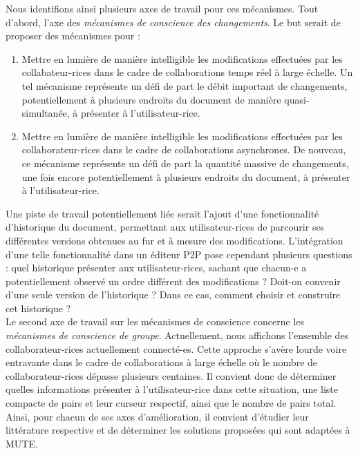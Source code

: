 Nous identifions ainsi plusieurs axes de travail pour ces mécanismes.
Tout d'abord, l'axe des \emph{mécanismes de conscience des changements}.
Le but serait de proposer des mécanismes pour :
\begin{enumerate}
    \item Mettre en lumière de manière intelligible les modifications effectuées par les collabateur-rices dans le cadre de collaborations temps réel à large échelle.
        Un tel mécanisme représente un défi de part le débit important de changements, potentiellement à plusieurs endroits du document de manière quasi-simultanée, à présenter à l'utilisateur-rice.
    \item Mettre en lumière de manière intelligible les modifications effectuées par les collaborateur-rices dans le cadre de collaborations asynchrones.
        De nouveau, ce mécanisme représente un défi de part la quantité massive de changements, une fois encore potentiellement à plusieurs endroits du document, à présenter à l'utilisateur-rice.
\end{enumerate}
Une piste de travail potentiellement liée serait l'ajout d'une fonctionnalité d'historique du document, permettant aux utilisateur-rices de parcourir ses différentes versions obtenues au fur et à mesure des modifications.
L'intégration d'une telle fonctionnalité dans un éditeur \ac{P2P} pose cependant plusieurs questions : quel historique présenter aux utilisateur-rices, sachant que chacun-e a potentiellement observé un ordre différent des modifications ?
Doit-on convenir d'une seule version de l'historique ?
Dans ce cas, comment choisir et construire cet historique ?\\

Le second axe de travail sur les mécanismes de conscience concerne les \emph{mécanismes de conscience de groupe}.
Actuellement, nous affichons l'ensemble des collaborateur-rices actuellement connecté-es.
Cette approche s'avère lourde voire entravante dans le cadre de collaborations à large échelle où le nombre de collaborateur-rices dépasse plusieurs centaines.
Il convient donc de déterminer quelles informations présenter à l'utilisateur-rice dans cette situation, \eg une liste compacte de pairs et leur curseur respectif, ainsi que le nombre de pairs total.\\

Ainsi, pour chacun de ses axes d'amélioration, il convient d'étudier leur littérature respective et de déterminer les solutions proposées qui sont adaptées à \ac{MUTE}.
